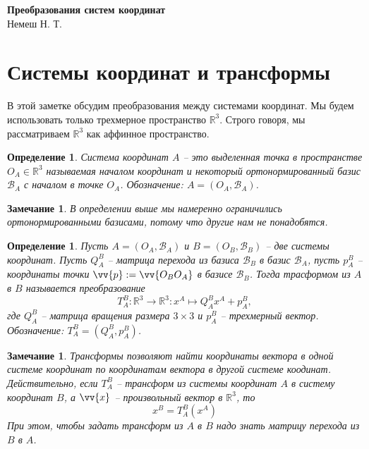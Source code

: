 \documentclass[12pt]{article}
\newtheorem{remark}[theorem]{Замечание}
\newtheorem{definition}[theorem]{Определение}
\begin{document}
\begin{center}

    \Large \textbf{Преобразования систем координат}\\[0.5cm]
    \small {Немеш Н. Т.}\\[0.5cm]

\end{center}
\date{March 2022}


\section{Системы координат и трансформы}

В этой заметке обсудим преобразования между системами координат. Мы будем использовать только
трехмерное пространство $\mathbb{R}^3$. Строго говоря, мы рассматриваем $\mathbb{R}^3$
как аффинное пространство.

\begin{definition}
    Система координат $A$ -- это выделенная точка в пространстве $O_A\in\mathbb{R}^3$
    называемая началом координат и некоторый ортонормированный базис $\mathcal{B}_A$
    с началом в точке $O_A$. Обозначение: $A=(O_A, \mathcal{B}_A)$.
\end{definition}

\begin{remark}
    В определении выше мы намеренно ограничились
    ортонормированными базисами, потому что другие нам не понадобятся.
\end{remark}

\begin{definition}
    Пусть $A=(O_A,\mathcal{B}_A)$ и $B=(O_B,\mathcal{B}_B)$ -- две системы координат.
    Пусть $Q_A^B$ -- матрица перехода из базиса $\mathcal{B}_B$ в базис $\mathcal{B}_A$,
    пусть $p_A^B$ -- координаты точки $\vv{p}:=\vv{O_BO_A}$ в базисе $\mathcal{B}_B$.
    Тогда трасформом из $A$ в $B$ называется преобразование
    $$
        T_A^B:\mathbb{R}^3\to\mathbb{R}^3: x^A \mapsto Q_A^B x^A + p_A^B,
    $$
    где $Q_A^B$ -- матрица вращения размера $3\times 3$ и $p_A^B$ -- трехмерный вектор. 
    Обозначение: $T_A^B=(Q_A^B,p_A^B)$.
\end{definition}

\begin{remark}
    Трансформы позволяют найти координаты вектора в одной системе координат
    по координатам вектора в другой системе коодинат. Действительно, если $T_A^B$ -- трансформ из
    системы координат $A$ в систему координат $B$, а $\vv{x}$ -- произвольный вектор в $\mathbb{R}^3$,
    то
    $$
        x^B=T_A^B(x^A)
    $$
    При этом, чтобы задать трансформ из $A$ в $B$ надо знать матрицу перехода из $B$ в $A$.
\end{remark}
\end{document}
